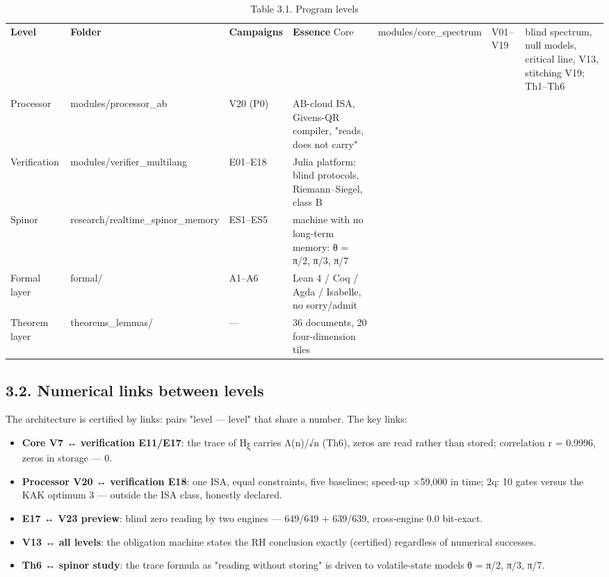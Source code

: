 \documentclass[11pt,a4paper]{article}
\begin{document}
\begin{table}[htbp]\centering\small
\caption{Table 3.1. Program levels}
\begin{tabular}{p{} p{} p{} p{}}
\toprule
\textbf{Level} & \textbf{Folder} & \textbf{Campaigns} & \textbf{Essence}
\midrule
Core & modules/core\_spectrum & V01–V19 & blind spectrum, null models, critical line, V13, stitching V19; Th1–Th6 \\
Processor & modules/processor\_ab & V20 (P0) & AB-cloud ISA, Givens-QR compiler, "reads, does not carry" \\
Verification & modules/verifier\_multilang & E01–E18 & Julia platform: blind protocols, Riemann–Siegel, class B \\
Spinor & research/realtime\_spinor\_memory & ES1–ES5 & machine with no long-term memory: θ = π/2, π/3, π/7 \\
Formal layer & formal/ & A1–A6 & Lean 4 / Coq / Agda / Isabelle, no sorry/admit \\
Theorem layer & theorems\_lemmas/ & — & 36 documents, 20 four-dimension tiles \\
\bottomrule
\end{tabular}
\end{table}

\subsection{3.2. Numerical links between levels}

The architecture is certified by links: pairs "level — level" that share a number. The key links:

\begin{itemize}
  \item \textbf{Core V7 ↔ verification E11/E17}: the trace of H\textsubscript{ξ} carries Λ(n)/√n (Th6), zeros are read rather than stored; correlation r = 0.9996, zeros in storage — 0.
  \item \textbf{Processor V20 ↔ verification E18}: one ISA, equal constraints, five baselines; speed-up ×59,000 in time; 2q: 10 gates versus the KAK optimum 3 — outside the ISA class, honestly declared.
  \item \textbf{E17 ↔ V23 preview}: blind zero reading by two engines — 649/649 + 639/639, cross-engine 0.0 bit-exact.
  \item \textbf{V13 ↔ all levels}: the obligation machine states the RH conclusion exactly (certified) regardless of numerical successes.
  \item \textbf{Th6 ↔ spinor study}: the trace formula as "reading without storing" is driven to volatile-state models θ = π/2, π/3, π/7.
\end{itemize}
\end{document}
